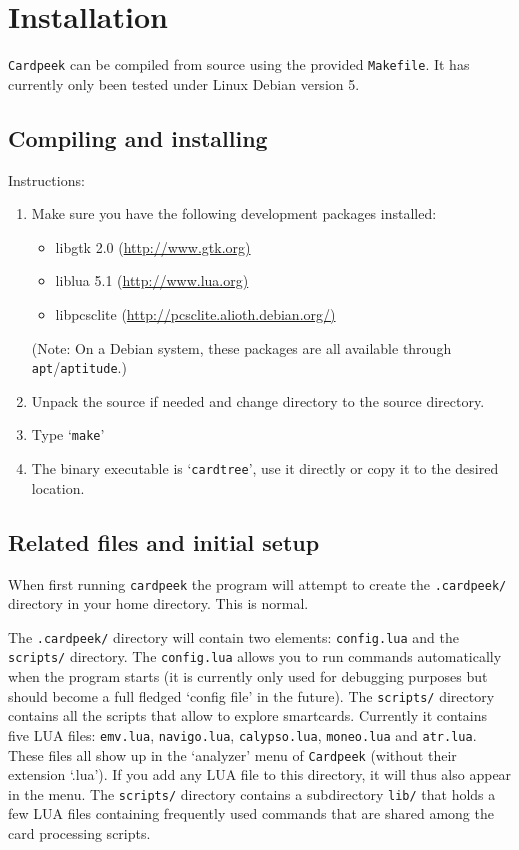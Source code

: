 \documentclass[11pt]{report}
\begin{document}
\tableofcontents

\chapter{Installation}

\texttt{Cardpeek} can be compiled from source using the provided \texttt{Makefile}.
It has currently only been tested under Linux Debian version 5.

\section{Compiling and installing}

Instructions:
\begin{enumerate}

\item{Make sure you have the following development packages installed:
  \begin{itemize}
  \item{libgtk 2.0 (\url{http://www.gtk.org)}}
  \item{liblua 5.1 (\url{http://www.lua.org)}}
  \item{libpcsclite (\url{http://pcsclite.alioth.debian.org/)}}
  \end{itemize}
(Note: On a Debian system, these packages are all available through \texttt{apt}/\texttt{aptitude}.)
}

\item{Unpack the source if needed and change directory to the source directory.}

\item{Type `\texttt{make}'}

\item{The binary executable is `\texttt{cardtree}', use it directly or copy it to the desired location.}

\end{enumerate}

\section{Related files and initial setup}
When first running \texttt{cardpeek} the program will attempt to create the
\texttt{.cardpeek/} directory in your home directory. This is normal.

The \texttt{.cardpeek/} directory will contain two elements: \texttt{config.lua} and the \texttt{scripts/} directory.
The \texttt{config.lua} allows you to run commands automatically when the program starts 
(it is currently only used for debugging purposes but should become a full fledged `config file' in the future).
The \texttt{scripts/} directory contains all the scripts that allow to explore smartcards. 
Currently it contains five LUA files: \texttt{emv.lua}, \texttt{navigo.lua}, \texttt{calypso.lua}, \texttt{moneo.lua} and \texttt{atr.lua}.
These files all show up in the `analyzer' menu of \texttt{Cardpeek} (without their extension `.lua').
If you add any LUA file to this directory, it will thus also appear in the menu.
The \texttt{scripts/} directory contains a subdirectory \texttt{lib/} that holds a few LUA files containing frequently used commands that are shared among the card processing scripts.
\end{document}
